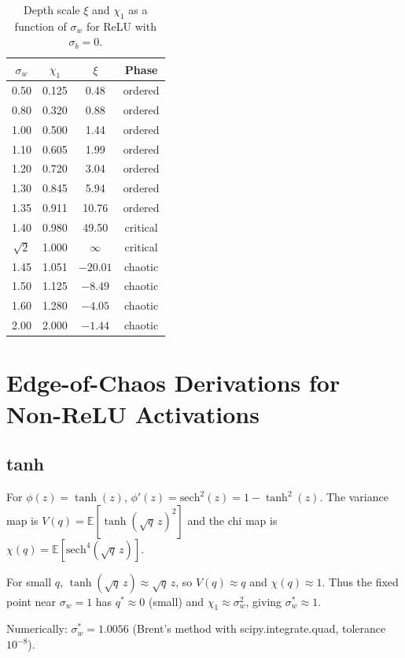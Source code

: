 \documentclass[10pt]{article}
\theoremstyle{definition}
\begin{document}
\begin{table}[H]
\centering
\caption{Depth scale $\xi$ and $\chi_1$ as a function of $\sigma_w$ for ReLU with $\sigma_b = 0$.}
\begin{tabular}{cccc}
\toprule
$\sigma_w$ & $\chi_1$ & $\xi$ & Phase \\
\midrule
0.50 & 0.125 & 0.48 & ordered \\
0.80 & 0.320 & 0.88 & ordered \\
1.00 & 0.500 & 1.44 & ordered \\
1.10 & 0.605 & 1.99 & ordered \\
1.20 & 0.720 & 3.04 & ordered \\
1.30 & 0.845 & 5.94 & ordered \\
1.35 & 0.911 & 10.76 & ordered \\
1.40 & 0.980 & 49.50 & critical \\
$\sqrt{2}$ & 1.000 & $\infty$ & critical \\
1.45 & 1.051 & $-20.01$ & chaotic \\
1.50 & 1.125 & $-8.49$ & chaotic \\
1.60 & 1.280 & $-4.05$ & chaotic \\
2.00 & 2.000 & $-1.44$ & chaotic \\
\bottomrule
\end{tabular}
\end{table}

\section{Edge-of-Chaos Derivations for Non-ReLU Activations}
\label{app:eoc-derivations}

\subsection{tanh}

For $\phi(z) = \tanh(z)$, $\phi'(z) = \text{sech}^2(z) = 1 - \tanh^2(z)$.
The variance map is $V(q) = \mathbb{E}[\tanh(\sqrt{q}\,z)^2]$ and the chi map is $\chi(q) = \mathbb{E}[\text{sech}^4(\sqrt{q}\,z)]$.

For small $q$, $\tanh(\sqrt{q}\,z) \approx \sqrt{q}\,z$, so $V(q) \approx q$ and $\chi(q) \approx 1$.
Thus the fixed point near $\sigma_w = 1$ has $q^* \approx 0$ (small) and $\chi_1 \approx \sigma_w^2$, giving $\sigma_w^* \approx 1$.

Numerically: $\sigma_w^* = 1.0056$ (Brent's method with scipy.integrate.quad, tolerance $10^{-8}$).
\end{document}
